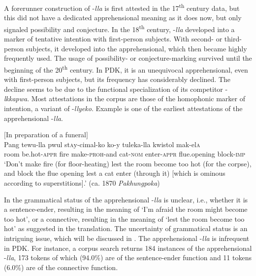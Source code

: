 \documentclass[output=paper,colorlinks,citecolor=brown]{langscibook}
\begin{document}
A forerunner construction of \nobreakdash-\textit{lla} is first attested in the 17\textsuperscript{th} century data, but this did not have a dedicated apprehensional meaning as it does now, but only signaled possibility and conjecture. In the 18\textsuperscript{th} century, \nobreakdash-\textit{lla} developed into a marker of tentative intention with first-person subjects. With second- or third-person subjects, it developed into the apprehensional, which then became highly frequently used. The usage of possibility- or conjecture-marking survived until the beginning of the 20\textsuperscript{th} century. In PDK, it is an unequivocal apprehensional, even with first-person subjects, but its frequency has considerably declined. The decline seems to be due to the functional specialization of its competitor \nobreakdash-\textit{lkkapwa}. Most attestations in the corpus are those of the homophonic marker of intention, a variant of \nobreakdash-\textit{llyeko}. Example  is one of the earliest attestations of the apprehensional \nobreakdash-\textit{lla}.


\ea \label{ex:RK10} \textnormal{$[$In preparation of a funeral$]$} \\
\gll Pang tewu-lla pwul st\textsc{a}y-cimal-ko ko-y tuleka-lla kwistol mak-el\textsc{a} \\
room be.hot-\textsc{appr} fire make-\textsc{proh}-and cat-\textsc{nom} enter-\textsc{appr} flue.opening block-\textsc{imp} \\
\glt `Don't make fire (for floor-heating) lest the room become too hot (for the corpse), and block the flue opening lest a cat enter (through it) [which is ominous according to superstitions].' (ca. 1870 \textit{Pakhungpoka})
\z

\noindent In  the grammatical status of the apprehensional \nobreakdash-\textit{lla} is unclear, i.e., whether it is a sentence-ender, resulting in the meaning of `I'm afraid the room might become too hot', or a connective, resulting in the meaning of `lest the room become too hot' as suggested in the translation. The uncertainty of grammatical status is an intriguing issue, which will be discussed in . The apprehensional \nobreakdash-\textit{lla} is infrequent in PDK. For instance, a corpus search returns 184 instances of the apprehensional \nobreakdash-\textit{lla}, 173 tokens of which (94.0\%) are of the sentence-ender function and 11 tokens (6.0\%) are of the connective function. 
\end{document}
